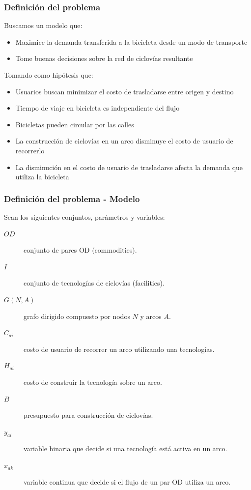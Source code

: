 \documentclass[aspectratio=43, 10pt]{beamer}
\begin{document}
\begin{frame}
    \frametitle{Definición del problema}

    Buscamos un modelo que:

    \begin{itemize}
        \item{Maximice la demanda transferida a la bicicleta desde un modo de transporte}
        \item{Tome buenas decisiones sobre la red de ciclovías resultante}
    \end{itemize}

    Tomando como hipótesis que:

    \begin{itemize}
        \item{Usuarios buscan minimizar el costo de trasladarse entre origen y destino}
        \item{Tiempo de viaje en bicicleta es independiente del flujo}
        \item{Bicicletas pueden circular por las calles}
        \item{La construcción de ciclovías en un arco disminuye el costo de usuario de recorrerlo}
        \item{La disminución en el costo de usuario de trasladarse afecta la demanda que utiliza la bicicleta}
    \end{itemize}
\end{frame}

\begin{frame}
    \frametitle{Definición del problema - Modelo}

    Sean los siguientes conjuntos, parámetros y variables:

    \begin{description}
        \item[$OD$] conjunto de pares OD (commodities).
        \item[$I$] conjunto de tecnologías de ciclovías (facilities).
        \item[$G(N,A)$] grafo dirigido compuesto por nodos $N$ y arcos $A$.
        \item[$C_{ai}$] costo de usuario de recorrer un arco utilizando una tecnologías.
        \item[$H_{ai}$] costo de construir la tecnología sobre un arco.
        \item[$B$] presupuesto para construcción de ciclovías.
        \item[$y_{ai}$] variable binaria que decide si una tecnología está activa en un arco.
        \item[$x_{ak}$] variable continua que decide si el flujo de un par OD utiliza un arco.
    \end{description}
\end{frame}
\end{document}
